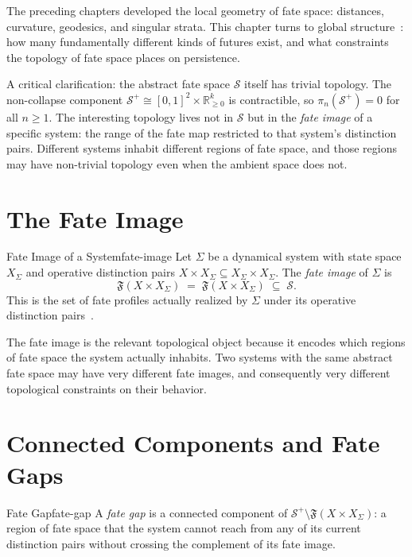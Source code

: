 \documentclass[12pt,twoside,openright]{book}
\newcommand{\distPairs}{X\times X}
\newcommand{\fateMap}{\mathfrak{F}}
\newcommand{\fateSpace}{\mathcal{S}}
\providecommand{\fatePos}{\fateSpace^{+}}
\providecommand{\fateImage}[1]{\fateMap(#1)}
\begin{document}
The preceding chapters developed the local geometry of fate
space: distances, curvature, geodesics, and singular strata.
This chapter turns to global structure~\cite{strogatz2015}: how many fundamentally
different kinds of futures exist, and what constraints the
topology of fate space places on persistence.

A critical clarification: the abstract fate space $\fateSpace$
itself has trivial topology. The non-collapse component
$\fatePos\cong[0,1]^2\times\mathbb{R}_{\ge0}^k$ is
contractible, so $\pi_n(\fatePos)=0$ for all $n\ge1$. The
interesting topology lives not in $\fateSpace$ but in the
\emph{fate image} of a specific system: the range of the fate
map restricted to that system's distinction pairs. Different
systems inhabit different regions of fate space, and those
regions may have non-trivial topology even when the ambient
space does not.

\section{The Fate Image}

\begin{definition}{Fate Image of a System}{fate-image}
Let $\Sigma$ be a dynamical system with state space $X_\Sigma$
and operative distinction pairs $\distPairs_\Sigma\subseteq
X_\Sigma\times X_\Sigma$. The \emph{fate image} of $\Sigma$
is
\[
  \fateImage{\distPairs_\Sigma}
  \;=\;
  \fateMap(\distPairs_\Sigma)
  \;\subseteq\;\fateSpace.
\]
This is the set of fate profiles actually realized by $\Sigma$
under its operative distinction pairs~\cite{rao1945}.
\end{definition}

The fate image is the relevant topological object because it
encodes which regions of fate space the system actually
inhabits. Two systems with the same abstract fate space may
have very different fate images, and consequently very
different topological constraints on their behavior.

\section{Connected Components and Fate Gaps}

\begin{definition}{Fate Gap}{fate-gap}
A \emph{fate gap} is a connected component of
$\fatePos\setminus\fateImage{\distPairs_\Sigma}$: a region of
fate space that the system cannot reach from any of its current
distinction pairs without crossing the complement of its fate
image.
\end{definition}
\end{document}
